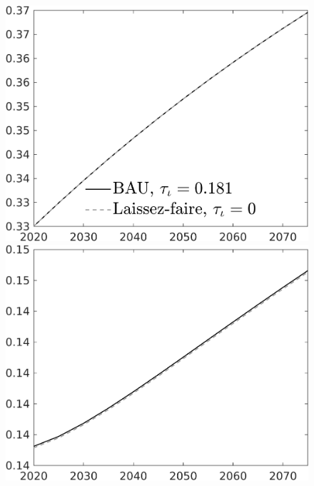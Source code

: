 \documentclass[12pt]{article}
\begin{document}
\begin{figure}[h!!]
\begin{minipage}[]{0.32\textwidth}
	\end{minipage}
	\begin{minipage}[]{0.32\textwidth}
		\includegraphics[width=1\textwidth]{../../codding_model/own_basedOnFried/optimalPol_010922_revision/figures/all_13Sept22/CompTaul_LFBAU_Reg0_pf_spillover0_nsk0_xgr0_knspil0_sep1_countec0_GovRev0_etaa0.79_lgd1.png}
	\end{minipage}	
	\begin{minipage}[]{0.32\textwidth}
		\includegraphics[width=1\textwidth]{../../codding_model/own_basedOnFried/optimalPol_010922_revision/figures/all_13Sept22/CompTaul_LFBAU_Reg0_pee_spillover0_nsk0_xgr0_knspil0_sep1_countec0_GovRev0_etaa0.79_lgd0.png}

\end{minipage}
\end{figure}
\end{document}
